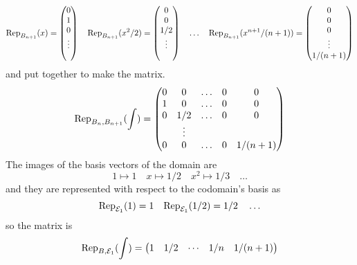 \begin{exercises}
\begin{answer}
\begin{exparts}
          \begin{equation*}
            \rep{x}{B_{n+1}}=\colvec{0 \\ 1 \\ 0 \\ \vdots \\ \ }
            \quad
            \rep{x^2/2}{B_{n+1}}=\colvec{0 \\ 0 \\ 1/2 \\ \vdots \\ \ }
            \quad\ldots\quad
            \rep{x^{n+1}/(n+1)}{B_{n+1}}
                     =\colvec{0 \\ 0 \\ 0 \\ \vdots \\ 1/(n+1)}
          \end{equation*}
          and put together to make the matrix.
          \begin{equation*}
            \rep{\int}{B_{n},B_{n+1}}
            =\begin{pmatrix}
              0  &0  &\ldots  &0      &0  \\
              1  &0  &\ldots  &0      &0  \\
              0  &1/2&\ldots  &0      &0  \\
                 &\vdots                  \\
              0  &0  &\ldots  &0      &1/(n+1)
            \end{pmatrix}
          \end{equation*}
        \partsitem The images of the basis vectors of the domain are
          \begin{equation*} 
            1\mapsto 1 
            \quad x\mapsto 1/2 
            \quad x^2\mapsto 1/3 
            \quad \ldots
          \end{equation*}
          and they are represented with respect to the codomain's basis as
          \begin{equation*}
            \rep{1}{\stdbasis_1}=1
            \quad \rep{1/2}{\stdbasis_1}=1/2
            \quad \ldots
          \end{equation*}
          so the matrix is 
          \begin{equation*}
            \rep{\int}{B,\stdbasis_1}
            =\begin{pmatrix}
              1  &1/2 &\cdots  &1/n    &1/(n+1)
            \end{pmatrix}
          \end{equation*}

\end{exparts}
\end{answer}
\end{exercises}
